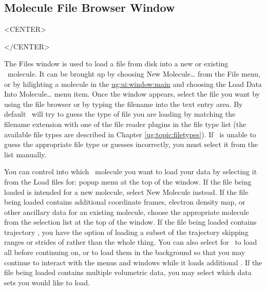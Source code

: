 %
%
%


\subsection{Molecule File Browser Window}
\label{ug:ui:window:files}

\begin{rawhtml}
<CENTER>
\end{rawhtml}
\begin{rawhtml}
</CENTER>
\end{rawhtml}

The {\sf Files} window is used to load a file from disk into a new or 
existing \VMD\  molecule. It can be brought up by choosing {\sf New 
Molecule\ldots} from the {\sf File} menu, or by hilighting a molecule in 
the \hyperref{{\sf Main} window}{{\sf Main} window}{}{ug:ui:window:main} and 
choosing the {\sf Load Data Into Molecule\ldots} menu item. 
Once the window appears, select the file you want by using the file 
browser or by typing the filename into the text entry area.
By default \VMD\ will try to guess the type of file you are loading
by matching the filename extension with one of the file reader plugins 
in the file type list (the available file types are described 
in Chapter \ref{ug:topic:filetypes}).
If \VMD\ is unable to guess the appropriate file type or guesses
incorrectly, you must select it from the list manually.

You can control into which \VMD\ molecule you want to load your data by 
selecting it from the {\sf Load files for:} popup menu at the top of the 
window.
If the file being loaded is intended for a new molecule, select {\sf New 
Molecule} instead. If the file being loaded
contains additional coordinate frames, electron density map, or other
ancillary data for an existing molecule, choose the appropriate molecule from
the selection list at the top of the window.  
If the file being loaded contains trajectory \timesteps, you have the 
option of loading a subset of the trajectory skipping ranges or strides
of \timesteps rather than the whole thing.  You can also select for \VMD\
to load all \timesteps before continuing on, or to load them in the background
so that you may continue to interact with the menus and windows while it loads
additional \timesteps.  
If the file being loaded contains multiple volumetric data, you may 
select which data sets you would like to load.


